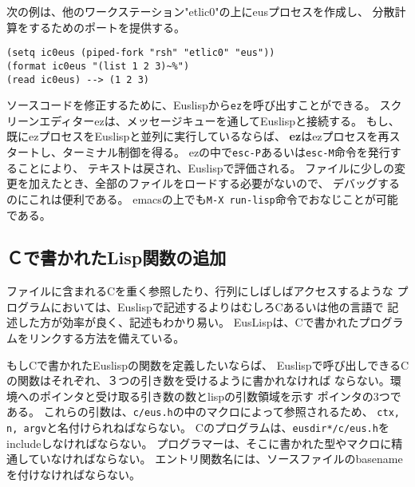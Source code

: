 次の例は、他のワークステーション"etlic0"の上にeusプロセスを作成し、
分散計算をするためのポートを提供する。

\begin{verbatim}
(setq ic0eus (piped-fork "rsh" "etlic0" "eus"))
(format ic0eus "(list 1 2 3)~%")
(read ic0eus) --> (1 2 3)
\end{verbatim}

ソースコードを修正するために、Euslispから{\tt ez}を呼び出すことができる。
スクリーンエディターezは、メッセージキューを通してEuslispと接続する。
もし、既にezプロセスをEuslispと並列に実行しているならば、
{\bf ez}はezプロセスを再スタートし、ターミナル制御を得る。
ezの中で{\tt esc-P}あるいは{\tt esc-M}命令を発行することにより、
テキストは戻され、Euslispで評価される。
ファイルに少しの変更を加えたとき、全部のファイルをロードする必要がないので、
デバッグするのにこれは便利である。
emacsの上でも{\tt M-X run-lisp}命令でおなじことが可能である。

\begin{refdesc}





\end{refdesc}

\newpage

\subsection{Ｃで書かれたLisp関数の追加}

ファイルに含まれるCを重く参照したり、行列にしばしばアクセスするような
プログラムにおいては、Euslispで記述するよりはむしろCあるいは他の言語で
記述した方が効率が良く、記述もわかり易い。
EusLispは、Cで書かれたプログラムをリンクする方法を備えている。

もしCで書かれたEuslispの関数を定義したいならば、
Euslispで呼び出しできるCの関数はそれぞれ、３つの引き数を受けるように書かれなければ
ならない。環境へのポインタと受け取る引き数の数とlispの引数領域を示す
ポインタの3つである。
これらの引数は、{\tt c/eus.h}の中のマクロによって参照されるため、
{\tt ctx, n, argv}と名付けられねばならない。
Cのプログラムは、{\tt *eusdir*/c/eus.h}をincludeしなければならない。
プログラマーは、そこに書かれた型やマクロに精通していなければならない。
エントリ関数名には、ソースファイルのbasenameを付けなければならない。

